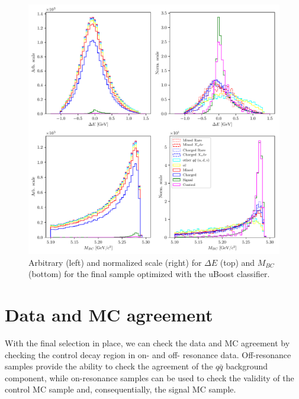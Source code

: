 \documentclass[oneside,a4paper,openany,12pt]{scrbook}
\begin{document}
\begin{figure}[H]
\centering
\captionsetup{width=0.8\linewidth}
\includegraphics[width=\linewidth]{fig/opt_1dc}
\caption{Arbitrary (left) and normalized scale (right) for $\Delta E$ (top) and $M_{BC}$ (bottom) for the final sample optimized with the uBoost classifier.}
\label{fig:opt1dc}
\end{figure} 

\section{Data and MC agreement}

With the final selection in place, we can check the data and MC agreement by checking the control decay region in on- and off- resonance data. Off-resonance samples provide the ability to check the agreement of the $q\bar q$ background component, while on-resonance samples can be used to check the validity of the control MC sample and, consequentially, the signal MC sample.
\end{document}
